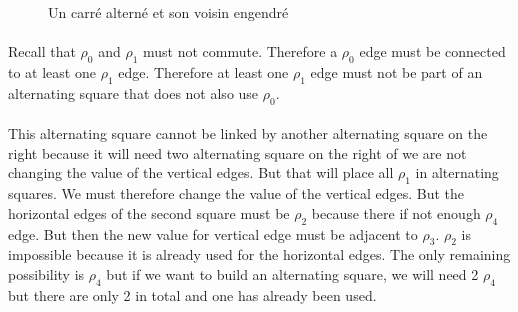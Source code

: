 \begin{figure}[H]
  \begin{center}
    \caption{Un carré alterné et son voisin engendré}
  \end{center}
\end{figure}

\paragraph{}
Recall that $\rho_0$ and $\rho_1$ must not commute. Therefore a $\rho_0$ edge must be connected to at least one $\rho_1$ edge. Therefore at least one $\rho_1$ edge must not be part of an alternating square that does not also use $\rho_0$.

\paragraph{}
This alternating square cannot be linked by another alternating square on the right because it will need two alternating square on the right of we are not changing the value of the vertical edges. But that will place all $\rho_1$ in alternating squares. We must therefore change the value of the vertical edges. But the horizontal edges of the second square must be $\rho_2$ because there if not enough $\rho_4$ edge. But then the new value for vertical edge must be adjacent to $\rho_3$. $\rho_2$ is impossible because it is already used for the horizontal edges. The only remaining possibility is $\rho_4$ but if we want to build an alternating square, we will need 2 $\rho_4$ but there are only 2 in total and one has already been used.

